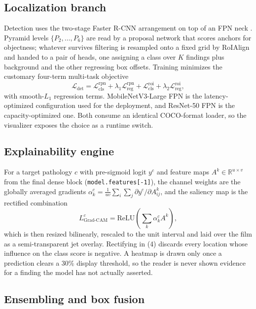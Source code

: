 \documentclass[conference]{IEEEtran}
\begin{document}
\subsection{Localization branch}

Detection uses the two-stage Faster R-CNN arrangement \cite{ren2015} on top of
an FPN neck \cite{lin2017fpn}. Pyramid levels $\{P_2, \ldots, P_6\}$ are read by
a proposal network that scores anchors for objectness; whatever survives
filtering is resampled onto a fixed grid by RoIAlign and handed to a pair of
heads, one assigning a class over $K$ findings plus background and the other
regressing box offsets. Training minimizes the customary four-term multi-task
objective
\begin{equation}
\mathcal{L}_{\mathrm{det}} = \mathcal{L}^{\mathrm{rpn}}_{\mathrm{cls}}
+ \lambda_1 \mathcal{L}^{\mathrm{rpn}}_{\mathrm{reg}}
+ \mathcal{L}^{\mathrm{roi}}_{\mathrm{cls}}
+ \lambda_2 \mathcal{L}^{\mathrm{roi}}_{\mathrm{reg}},
\end{equation}
with smooth-$L_1$ regression terms. MobileNetV3-Large FPN \cite{howard2019} is
the latency-optimized configuration used for the deployment, and ResNet-50 FPN
\cite{he2016} is the capacity-optimized one. Both consume an identical
COCO-format loader, so the visualizer exposes the choice as a runtime switch.

\subsection{Explainability engine}

For a target pathology $c$ with pre-sigmoid logit $y^c$ and feature maps $A^k
\in \mathbb{R}^{u \times v}$ from the final dense block
(\texttt{model.features[-1]}), the channel weights are the globally averaged
gradients $\alpha^c_k = \frac{1}{uv}\sum_i \sum_j \partial y^c / \partial
A^k_{ij}$, and the saliency map is the rectified combination
\begin{equation}
L^c_{\text{Grad-CAM}} = \mathrm{ReLU}\!\left(\sum_k \alpha^c_k A^k\right),
\end{equation}
which is then resized bilinearly, rescaled to the unit interval and laid over
the film as a semi-transparent jet overlay. Rectifying in (4) discards every
location whose influence on the class score is negative. A heatmap is drawn only
once a prediction clears a 30\% display threshold, so the reader is never shown
evidence for a finding the model has not actually asserted.

\subsection{Ensembling and box fusion}
\end{document}
